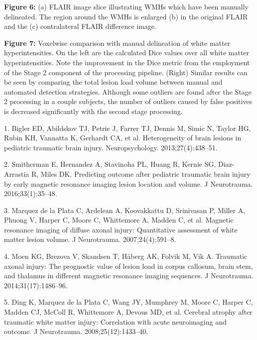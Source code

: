 \documentclass[11pt,]{article}
\begin{document}
\textbf{Figure 6:} (a) FLAIR image slice illustrating WMHs which have
been manually delineated. The region around the WMHs is enlarged (b) in
the original FLAIR and the (c) contralateral FLAIR difference image.

\textbf{Figure 7:} Voxelwise comparison with manual delineation of white
matter hyperintensities. On the left are the calculated Dice values over
all white matter hyperintensities. Note the improvement in the Dice
metric from the employment of the Stage 2 component of the processing
pipeline. (Right) Similar results can be seen by comparing the total
lesion load volume between manual and automated detection strategies.
Although some outliers are found after the Stage 2 processing in a
couple subjects, the number of outliers caused by false positives is
decreased significantly with the second stage processing.

\clearpage

\hypertarget{refs}{}
\hypertarget{ref-Bigler:2013aa}{}
1. Bigler ED, Abildskov TJ, Petrie J, Farrer TJ, Dennis M, Simic N,
Taylor HG, Rubin KH, Vannatta K, Gerhardt CA, et al. Heterogeneity of
brain lesions in pediatric traumatic brain injury. Neuropsychology.
2013;27(4):438--51.

\hypertarget{ref-Smitherman:2016aa}{}
2. Smitherman E, Hernandez A, Stavinoha PL, Huang R, Kernie SG,
Diaz-Arrastia R, Miles DK. Predicting outcome after pediatric traumatic
brain injury by early magnetic resonance imaging lesion location and
volume. J Neurotrauma. 2016;33(1):35--48.

\hypertarget{ref-Marquez-de-la-Plata:2007aa}{}
3. Marquez de la Plata C, Ardelean A, Koovakkattu D, Srinivasan P,
Miller A, Phuong V, Harper C, Moore C, Whittemore A, Madden C, et al.
Magnetic resonance imaging of diffuse axonal injury: Quantitative
assessment of white matter lesion volume. J Neurotrauma.
2007;24(4):591--8.

\hypertarget{ref-Moen:2014aa}{}
4. Moen KG, Brezova V, Skandsen T, Håberg AK, Folvik M, Vik A. Traumatic
axonal injury: The prognostic value of lesion load in corpus callosum,
brain stem, and thalamus in different magnetic resonance imaging
sequences. J Neurotrauma. 2014;31(17):1486--96.

\hypertarget{ref-Ding:2008aa}{}
5. Ding K, Marquez de la Plata C, Wang JY, Mumphrey M, Moore C, Harper
C, Madden CJ, McColl R, Whittemore A, Devous MD, et al. Cerebral atrophy
after traumatic white matter injury: Correlation with acute neuroimaging
and outcome. J Neurotrauma. 2008;25(12):1433--40.
\end{document}
